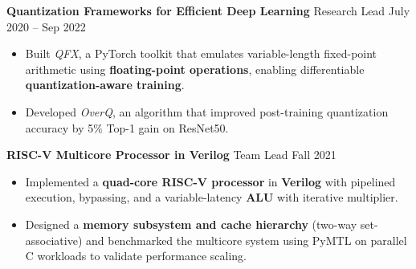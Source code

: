 \documentclass[letterpaper,10pt]{article}
\newcommand{\experienceBulletListStart}{\begin{itemize}[leftmargin=0.3in, label=$\bullet$, topsep=2pt, itemsep=0.2em, parsep=0pt]}
\newcommand{\experienceBulletListEnd}{\end{itemize}\vspace{4pt}}
\newcommand{\projectTitle}[2]{
    \textbf{#1} \hfill #2
    \vspace{-2pt}
}
\newcommand{\projectTitleWithRole}[3]{
    \textbf{#1} \hspace{0.5em} \normalsize{#2} \hfill #3
    \vspace{-2pt}
}
\begin{document}
\projectTitleWithRole{Quantization Frameworks for Efficient Deep Learning}{Research Lead}{July 2020 – Sep 2022}
\experienceBulletListStart
  \item\normalsize{Built \textit{QFX}, a PyTorch toolkit that emulates variable-length fixed-point arithmetic using \textbf{floating-point operations}, enabling differentiable \textbf{quantization-aware training}.}
  \item\normalsize{Developed \textit{OverQ}, an algorithm that improved post-training quantization accuracy by 5\% Top-1 gain on ResNet50.}
\experienceBulletListEnd



\projectTitleWithRole{RISC-V Multicore Processor in Verilog}{Team Lead}{Fall 2021}
\experienceBulletListStart
  \item\normalsize{Implemented a \textbf{quad-core RISC-V processor} in \textbf{Verilog} with pipelined execution, bypassing, and a variable-latency \textbf{ALU} with iterative multiplier.}
  \item\normalsize{Designed a \textbf{memory subsystem and cache hierarchy} (two-way set-associative) and benchmarked the multicore system using PyMTL on parallel C workloads to validate performance scaling.}
\experienceBulletListEnd
\end{document}
